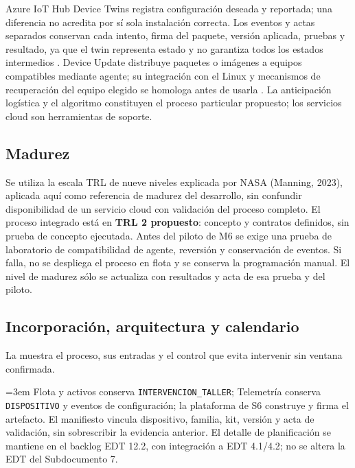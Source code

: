 Azure IoT Hub Device Twins registra configuración deseada y reportada; una diferencia no acredita por sí sola instalación correcta. Los eventos y actas separados conservan cada intento, firma del paquete, versión aplicada, pruebas y resultado, ya que el twin representa estado y no garantiza todos los estados intermedios \parencite{d3_device_twins}. Device Update distribuye paquetes o imágenes a equipos compatibles mediante agente; su integración con el Linux y mecanismos de recuperación del equipo elegido se homologa antes de usarla \parencite{d3_device_update}. La anticipación logística y el algoritmo constituyen el proceso particular propuesto; los servicios cloud son herramientas de soporte.

\subsection{Madurez}\label{sec:13-proceso-madurez}

Se utiliza la escala TRL de nueve niveles explicada por NASA (Manning, 2023), aplicada aquí como referencia de madurez del desarrollo, sin confundir disponibilidad de un servicio cloud con validación del proceso completo. El proceso integrado está en \textbf{TRL 2 propuesto}: concepto y contratos definidos, sin prueba de concepto ejecutada. Antes del piloto de M6 se exige una prueba de laboratorio de compatibilidad de agente, reversión y conservación de eventos. Si falla, no se despliega el proceso en flota y se conserva la programación manual. El nivel de madurez sólo se actualiza con resultados y acta de esa prueba y del piloto.

\subsection{Incorporación, arquitectura y calendario}\label{sec:13-proceso-incorporacion-arquitectura-y-calendario}

La  muestra el proceso, sus entradas y el control que evita intervenir sin ventana confirmada.


\begingroup\emergencystretch=3em
Flota y activos conserva \texttt{INTERVENCION\_\allowbreak{}TALLER}; Telemetría conserva \texttt{DISPOSITIVO} y eventos de configuración; la plataforma de S6 construye y firma el artefacto. El manifiesto vincula dispositivo, familia, kit, versión y acta de validación, sin sobrescribir la evidencia anterior. El detalle de planificación se mantiene en el backlog EDT 12.2, con integración a EDT 4.1/4.2; no se altera la EDT del Subdocumento 7.\par\endgroup

